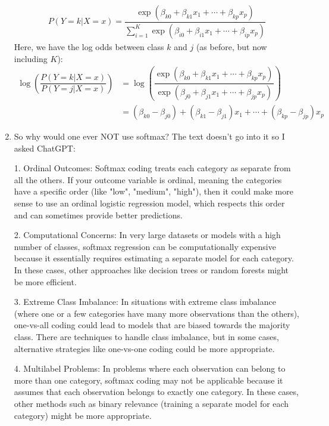 \documentclass[10pt]{article}
\begin{document}
\begin{enumerate}
	\begin{align*}
		P(Y = k| X = x ) = \dfrac{\exp(\beta_{k0} + \beta_{k1}x_1 + \cdots + \beta_{kp}x_p )}{\sum_{i = 1}^K \exp(\beta_{i0} + \beta_{i1}x_1 + \cdots + \beta_{ip}x_p)}
	\end{align*}
	Here, we have the log odds between class $k$ and $j$ (as before, but now including $K$):
	\begin{align*}
		\log\left( \dfrac{P(Y = k| X  = x)}{P(Y = j| X = x )}\right) 
		&= \log\left(\dfrac{\exp(\beta_{k0} + \beta_{k1}x_1 + \cdots + \beta_{kp}x_p)}{\exp(\beta_{j0} + \beta_{j1}x_1 + \cdots + \beta_{jp}x_p)} \right) \\
		&= (\beta_{k0} - \beta_{j0}) + (\beta_{k1} - \beta_{j1})x_1 + \cdots + (\beta_{kp} - \beta_{jp}) x_p 
	\end{align*}
	\item {\color{brown} So why would one ever NOT use softmax?  The text doesn't go into it so I asked ChatGPT: 
	
	1. Ordinal Outcomes: Softmax coding treats each category as separate from all the others. If your outcome variable is ordinal, meaning the categories have a specific order (like "low", "medium", "high"), then it could make more sense to use an ordinal logistic regression model, which respects this order and can sometimes provide better predictions.

	2. Computational Concerns: In very large datasets or models with a high number of classes, softmax regression can be computationally expensive because it essentially requires estimating a separate model for each category. In these cases, other approaches like decision trees or random forests might be more efficient.
	
	3. Extreme Class Imbalance: In situations with extreme class imbalance (where one or a few categories have many more observations than the others), one-vs-all coding could lead to models that are biased towards the majority class. There are techniques to handle class imbalance, but in some cases, alternative strategies like one-vs-one coding could be more appropriate.
	
	4. Multilabel Problems: In problems where each observation can belong to more than one category, softmax coding may not be applicable because it assumes that each observation belongs to exactly one category. In these cases, other methods such as binary relevance (training a separate model for each category) might be more appropriate.}
\end{enumerate}
\end{document}
